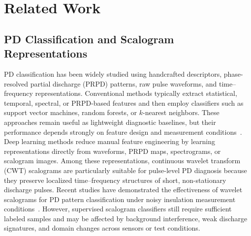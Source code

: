 \documentclass[journal]{IEEEtran}
\newcommand{\1}{\mathbf{1}}
\begin{document}
\section{Related Work}
\label{sec:related_work}

\subsection{PD Classification and Scalogram Representations}
PD classification has been widely studied using handcrafted descriptors, phase-resolved partial discharge (PRPD) patterns, raw pulse waveforms, and time--frequency representations. Conventional methods typically extract statistical, temporal, spectral, or PRPD-based features and then employ classifiers such as support vector machines, random forests, or $k$-nearest neighbors. These approaches remain useful as lightweight diagnostic baselines, but their performance depends strongly on feature design and measurement conditions~\cite{Wu2015PDOverview,Sahoo2024MeasurementPDMLDL}. Deep learning methods reduce manual feature engineering by learning representations directly from waveforms, PRPD maps, spectrograms, or scalogram images. Among these representations, continuous wavelet transform (CWT) scalograms are particularly suitable for pulse-level PD diagnosis because they preserve localized time--frequency structures of short, non-stationary discharge pulses. Recent studies have demonstrated the effectiveness of wavelet scalograms for PD pattern classification under noisy insulation measurement conditions~\cite{Sahoo2024TIMScalogram,Sahoo2024MeasurementPDMLDL}. However, supervised scalogram classifiers still require sufficient labeled samples and may be affected by background interference, weak discharge signatures, and domain changes across sensors or test conditions.
\end{document}
